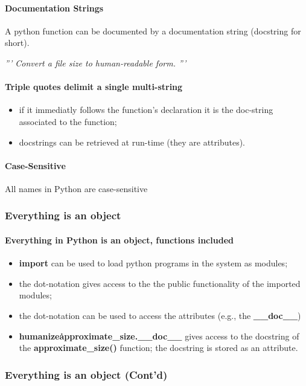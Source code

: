 \paragraph{Documentation Strings}
A python function can be documented by a documentation string (docstring for short).
\begin{center}
	\textit{''' Convert a file size to human-readable form.  '''}
\end{center}
\paragraph{Triple quotes delimit a single multi-string}
\begin{itemize}
	\item if it immediatly follows the function's declaration it is the doc-string associated to the function;
	\item docstrings can be retrieved at run-time (they are attributes).
\end{itemize}
\paragraph{Case-Sensitive}
All names in Python are case-sensitive
\subsubsection{Everything is an object}
\paragraph{Everything in Python is an object, functions included}
\begin{itemize}
	\item \textbf{import} can be used to load python programs in the system as modules;
	\item the dot-notation gives access to the the public functionality of the imported modules;
	\item the dot-notation can be used to access the attributes (e.g., the \textbf{\_\_doc\_\_})
	\item \textbf{humanize\.approximate\_size.\_\_doc\_\_} gives access to the docstring of the \textbf{approximate\_size()} function; the docstring is stored as an attribute.
\end{itemize}
\subsubsection{Everything is an object (Cont'd)}
